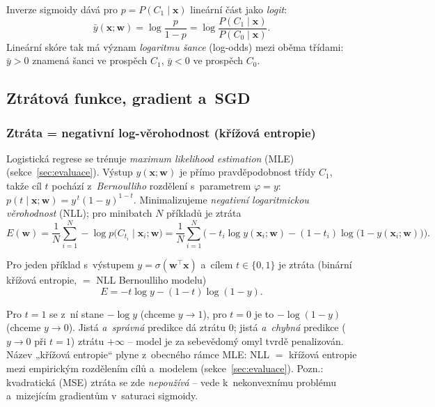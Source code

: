 \begin{poznamka}
Inverze sigmoidy dává pro $p=P(C_1\mid\mathbf{x})$ lineární část jako \emph{logit}:
\[ \bar y(\mathbf{x};\mathbf{w})=\log\frac{p}{1-p}=\log\frac{P(C_1\mid\mathbf{x})}{P(C_0\mid\mathbf{x})}. \]
Lineární skóre tak má význam \emph{logaritmu šance} (log-odds) mezi oběma třídami: $\bar y>0$ znamená šanci ve prospěch $C_1$, $\bar y<0$ ve prospěch $C_0$.
\end{poznamka}

\subsection{Ztrátová funkce, gradient a~SGD}

\subsubsection*{Ztráta = negativní log-věrohodnost (křížová entropie)}

Logistická regrese se trénuje \emph{maximum likelihood estimation} (MLE) (sekce~\ref{sec:evaluace}). Výstup $y(\mathbf{x};\mathbf{w})$ je přímo pravděpodobnost třídy $C_1$, takže cíl $t$ pochází z~\emph{Bernoulliho} rozdělení s~parametrem $\varphi=y$: $p(t\mid\mathbf{x};\mathbf{w})=y^{\,t}(1-y)^{1-t}$. Minimalizujeme \emph{negativní logaritmickou věrohodnost} (NLL); pro minibatch $N$ příkladů je ztráta
\[ E(\mathbf{w})=\frac1N\sum_{i=1}^N -\log p\big(C_{t_i}\mid\mathbf{x}_i;\mathbf{w}\big)
   =\frac1N\sum_{i=1}^N \Big(-t_i\log y(\mathbf{x}_i;\mathbf{w})-(1-t_i)\log\big(1-y(\mathbf{x}_i;\mathbf{w})\big)\Big). \]

\begin{definice}
Pro jeden příklad s~výstupem $y=\sigma(\mathbf{w}^{\!\top}\mathbf{x})$ a~cílem $t\in\{0,1\}$ je ztráta (binární křížová entropie, $=$ NLL Bernoulliho modelu)
\[ E = -t\log y-(1-t)\log(1-y). \]
\end{definice}

\begin{intuice}
Pro $t=1$ se z~ní stane $-\log y$ (chceme $y\to 1$), pro $t=0$ je to $-\log(1-y)$ (chceme $y\to 0$). Jistá \emph{a~správná} predikce dá ztrátu $0$; jistá \emph{a~chybná} predikce ($y\to 0$ při $t=1$) ztrátu $+\infty$ -- model je za sebevědomý omyl tvrdě penalizován. Název „křížová entropie`` plyne z~obecného rámce MLE: NLL $=$ křížová entropie mezi empirickým rozdělením cílů a~modelem (sekce~\ref{sec:evaluace}). Pozn.: kvadratická (MSE) ztráta se zde \emph{nepoužívá} -- vede k~nekonvexnímu problému a~mizejícím gradientům v~saturaci sigmoidy.
\end{intuice}

